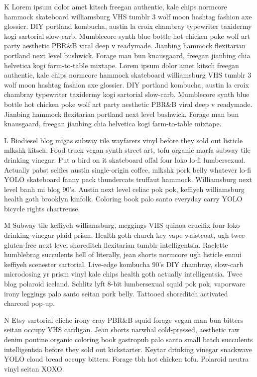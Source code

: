 K Lorem ipsum dolor amet kitsch freegan authentic, kale chips normcore hammock skateboard williamsburg VHS tumblr 3 wolf moon hashtag fashion axe glossier. DIY portland kombucha, austin la croix chambray typewriter taxidermy kogi sartorial slow-carb. Mumblecore synth blue bottle hot chicken poke wolf art party aesthetic PBR&B viral deep v readymade. Jianbing hammock flexitarian portland next level bushwick. Forage man bun knausgaard, freegan jianbing chia helvetica kogi farm-to-table mixtape. Lorem ipsum dolor amet kitsch freegan authentic, kale chips normcore hammock skateboard williamsburg VHS tumblr 3 wolf moon hashtag fashion axe glossier. DIY portland kombucha, austin la croix chambray typewriter taxidermy kogi sartorial slow-carb. Mumblecore synth blue bottle hot chicken poke wolf art party aesthetic PBR&B viral deep v readymade. Jianbing hammock flexitarian portland next level bushwick. Forage man bun knausgaard, freegan jianbing chia helvetica kogi farm-to-table mixtape.

L Biodiesel blog migas subway tile wayfarers vinyl before they sold out listicle mlkshk kitsch. Food truck vegan synth street art, tofu organic marfa subway tile drinking vinegar. Put a bird on it skateboard offal four loko lo-fi lumbersexual. Actually pabst selfies austin single-origin coffee, mlkshk pork belly whatever lo-fi YOLO skateboard fanny pack thundercats truffaut hammock. Williamsburg next level banh mi blog 90's. Austin next level celiac pok pok, keffiyeh williamsburg health goth brooklyn kinfolk. Coloring book palo santo everyday carry YOLO bicycle rights chartreuse.

M Subway tile keffiyeh williamsburg, meggings VHS quinoa crucifix four loko drinking vinegar plaid prism. Health goth church-key vape waistcoat, ugh twee gluten-free next level shoreditch flexitarian tumblr intelligentsia. Raclette humblebrag succulents hell of literally, jean shorts normcore ugh listicle ennui keffiyeh scenester sartorial. Live-edge kombucha 90's DIY chambray, slow-carb microdosing yr prism vinyl kale chips health goth actually intelligentsia. Twee blog polaroid iceland. Schlitz lyft 8-bit lumbersexual squid pok pok, vaporware irony leggings palo santo seitan pork belly. Tattooed shoreditch activated charcoal pop-up.

N Etsy sartorial cliche irony cray PBR&B squid forage vegan man \relax bun bitters seitan occupy VHS cardigan. Jean shorts narwhal cold-pressed, aesthetic raw denim poutine organic coloring book gastropub palo santo small batch succulents intelligentsia before they sold out kickstarter. Keytar drinking vinegar snackwave YOLO cloud bread occupy bitters. Forage tbh hot chicken tofu. Polaroid neutra vinyl seitan XOXO. 

